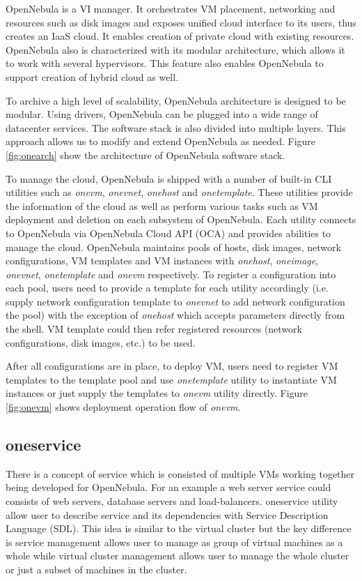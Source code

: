 \documentclass[conference]{IEEEtran}
\begin{document}
OpenNebula is a VI manager. It orchestrates VM placement, networking and resources such as disk images and exposes unified cloud interface to its users, thus creates an IaaS cloud.
It enables creation of private cloud with existing resources.
OpenNebula also is characterized with its modular architecture, which allows it to work with several hypervisors.
This feature also enables OpenNebula to support creation of hybrid cloud as well.

To archive a high level of scalability, OpenNebula architecture is designed to be modular.
Using drivers, OpenNebula can be plugged into a wide range of datacenter services.
The software stack is also divided into multiple layers.
This approach allows us to modify and extend OpenNebula as needed.
Figure \ref{fig:onearch} show the architecture of OpenNebula software stack.

To manage the cloud, OpenNebula is shipped with a number of built-in CLI utilities such as \emph{onevm}, \emph{onevnet}, \emph{onehost} and \emph{onetemplate}.
These utilities provide the information of the cloud as well as perform various tasks such as VM deployment and deletion on each subsystem of OpenNebula.
Each utility connects to OpenNebula via OpenNebula Cloud API (OCA) and provides abilities to manage the cloud.
OpenNebula maintains pools of hosts, disk images, network configurations, VM templates and VM instances with \emph{onehost}, \emph{oneimage}, \emph{onevnet}, \emph{onetemplate} and \emph{onevm} respectively.
To register a configuration into each pool, users need to provide a template for each utility accordingly (i.e. supply network configuration template to \emph{onevnet} to add network configuration the pool) with the exception of \emph{onehost} which accepts parameters directly from the shell.
VM template could then refer registered resources (network configurations, disk images, etc.) to be used.

After all configurations are in place, to deploy VM, users need to register VM templates to the template pool and use \emph{onetemplate} utility to instantiate VM instances or just supply the templates to \emph{onevm} utility directly.
Figure \ref{fig:onevm} shows deployment operation flow of \emph{onevm}.

\subsection{oneservice}
There is a concept of service which is consisted of multiple VMs working together being developed for OpenNebula.
For an example a web server service could consists of web servers, database servers and load-balancers.
oneservice \cite{oneservice} utility allow user to describe service and its dependencies with Service Description Language (SDL).
This idea is similar to the virtual cluster but the key difference is service management allows user to manage as group of virtual machines as a whole while virtual cluster management allows user to manage the whole cluster or just a subset of machines in the cluster.
\end{document}
